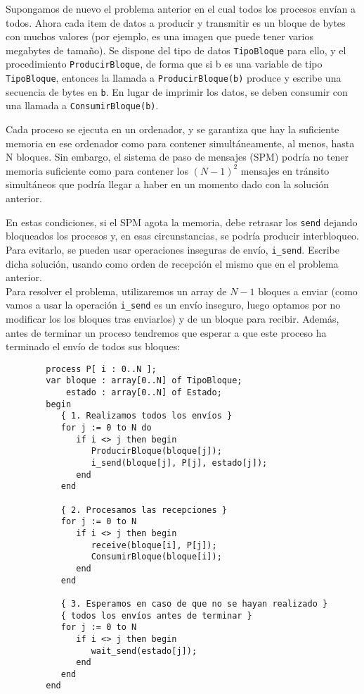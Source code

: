\begin{ejercicio}\label{ej:rel3_13}
    Supongamos de nuevo el problema anterior en el cual todos los procesos envían a todos. Ahora cada item de datos a producir y transmitir es un bloque de bytes con muchos valores (por ejemplo, es una imagen que puede tener varios megabytes de tamaño). Se dispone del tipo de datos \verb|TipoBloque| para ello, y el procedimiento \verb|ProducirBloque|, de forma que si b es una variable de tipo \verb|TipoBloque|, entonces la llamada a \verb|ProducirBloque(b)| produce y escribe una secuencia de bytes en \verb|b|. En lugar de imprimir los datos, se deben consumir con una llamada a \verb|ConsumirBloque(b)|.

    Cada proceso se ejecuta en un ordenador, y se garantiza que hay la suficiente memoria en ese ordenador como para contener simultáneamente, al menos, hasta N bloques. Sin embargo, el sistema de paso de mensajes (SPM) podría no tener memoria suficiente como para contener los ${(N-1)}^{2}$ mensajes en tránsito simultáneos que podría llegar a haber en un momento dado con la solución anterior.

    En estas condiciones, si el SPM agota la memoria, debe retrasar los \verb|send| dejando bloqueados los procesos y, en esas circunstancias, se podría producir interbloqueo. Para evitarlo, se pueden usar operaciones inseguras de envío, \verb|i_send|. Escribe dicha solución, usando como orden de recepción el mismo que en el problema anterior.\\

    \noindent
    Para resolver el problema, utilizaremos un array de $N-1$ bloques a enviar (como vamos a usar la operación \verb|i_send| es un envío inseguro, luego optamos por no modificar los los bloques tras enviarlos) y de un bloque para recibir. Además, antes de terminar un proceso tendremos que esperar a que este proceso ha terminado el envío de todos sus bloques:
    \begin{verbatim}
        process P[ i : 0..N ];
        var bloque : array[0..N] of TipoBloque;
            estado : array[0..N] of Estado;
        begin
           { 1. Realizamos todos los envíos }
           for j := 0 to N do
              if i <> j then begin
                 ProducirBloque(bloque[j]);
                 i_send(bloque[j], P[j], estado[j]);
              end
           end

           { 2. Procesamos las recepciones }
           for j := 0 to N
              if i <> j then begin
                 receive(bloque[i], P[j]);
                 ConsumirBloque(bloque[i]);
              end
           end

           { 3. Esperamos en caso de que no se hayan realizado }
           { todos los envíos antes de terminar }
           for j := 0 to N
              if i <> j then begin
                 wait_send(estado[j]);
              end
           end
        end
    \end{verbatim}
\end{ejercicio}

